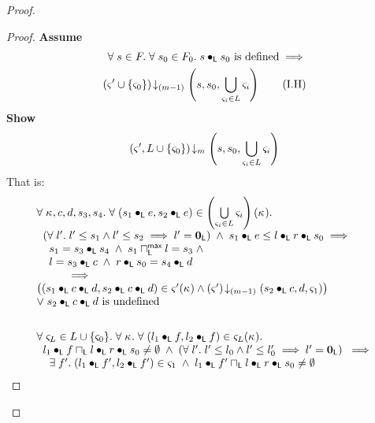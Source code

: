 \begin{lemma}[]
\begin{proof}
\begin{proof}
\noindent\textbf{Assume}
\begin{align}
	\forall\; s \in F.\;\forall\; s_0 \in F_0.\; s \bullet_{\textsf{L}} s_0  \text{ is defined}  \implies \nonumber\\
	 \left(\varsigma_{}' \cup \{\varsigma_{0}\}\right) \!\downarrow_{(m-1)} \left(s, s_0, \bigcup\limits_{\varsigma_{i} \in L} \varsigma_{i}\right)
	\tag{I.H} \label{LAW2:I.H}
\end{align}
\textbf{Show } 
%
\begin{align}
	\left(\varsigma_{}', L \cup \{\varsigma_{0}\}\right) \!\downarrow_{m} \left(s, s_0, \bigcup\limits_{\varsigma_{i} \in L} \varsigma_{i}\right) \nonumber
\end{align}
%
That is:
%
\begin{align}
	&\begin{array}{l}
		\forall\; \kappa_{}, c, d, s_3, s_4.\;\forall\; (s_1 \bullet_{\textsf{L}} e, s_2 \bullet_{\textsf{L}} e) \in \left(\bigcup\limits_{\varsigma_{i} \in L} \varsigma_{i}\right)(\kappa_{}).\; \\
	\hspace*{0.2cm}\left(\forall\; l'.\; l' \leq s_1 \land l' \leq s_2 \implies l' = \mathbf{0}_{\textsf{L}}\right) \;\land\; s_1 \bullet_{\textsf{L}} e \leq  l \bullet_{\textsf{L}} r \bullet_{\textsf{L}} s_0 \implies\\
	\hspace*{0.4cm} s_1 = s_3 \bullet_{\textsf{L}} s_4 \;\land\; s_1 \sqcap_{\textsf{L}}^{\textsf{max}} l = s_3 \;\land\\
	\hspace*{0.4cm} l = s_3 \bullet_{\textsf{L}} c \;\land\; r \bullet_{\textsf{L}} s_0 = s_4 \bullet_{\textsf{L}} d \\
	\hspace*{1cm}\implies\\
	\left((s_1 \bullet_{\textsf{L}} c \bullet_{\textsf{L}} d, s_2 \bullet_{\textsf{L}} c \bullet_{\textsf{L}} d) \in \varsigma_{}'(\kappa_{}) \land
	\left(\varsigma_{}'\right) \!\downarrow_{(m-1)} \left(s_2 \bullet_{\textsf{L}} c, d, \varsigma_{1}\right)\right)\\
	\lor\; s_2 \bullet_{\textsf{L}} c \bullet_{\textsf{L}} d \text{ is undefined}
	\end{array} \label{LAW:Goal10} \\\nonumber\\
	&\begin{array}{l}
		\forall\; \varsigma_{L} \in L \cup \{\varsigma_{0}\}.\; \forall\; \kappa_{}.\; \forall\; (l_1 \bullet_{\textsf{L}} f, l_2 \bullet_{\textsf{L}} f) \in \varsigma_{L}(\kappa_{}).\; \\
  \hspace*{0.2cm} l_1 \bullet_{\textsf{L}} f \sqcap_{\textsf{L}} l \bullet_{\textsf{L}} r \bullet_{\textsf{L}} s_0 \not= \emptyset \;\land\; \left(\forall\; l'.\; l' \leq l_0 \land l' \leq l'_0 \implies l' = \mathbf{0}_{\textsf{L}}\right)  \;\implies\\
  \hspace*{0.4cm}\exists\; f'.\; (l_1 \bullet_{\textsf{L}} f', l_2 \bullet_{\textsf{L}} f') \in \varsigma_{1} \;\land\; l_1 \bullet_{\textsf{L}} f' \sqcap_{\textsf{L}} l \bullet_{\textsf{L}} r \bullet_{\textsf{L}} s_0 \not= \emptyset\\

\end{array}
\end{align}
\end{proof}
\end{proof}
\end{lemma}

